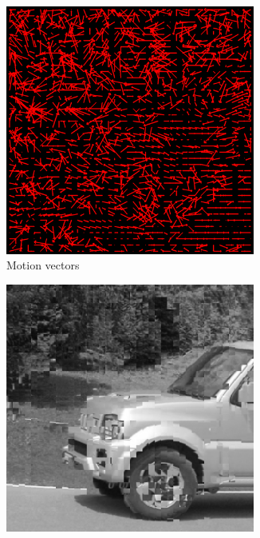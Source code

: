 \documentclass{homework}
\begin{document}
\begin{figure}[H]
    \centering
    \begin{subfigure}{0.32\textwidth}
        \centering
        \includegraphics[width=0.9\textwidth]{8_8_TSS_motion_vectors.png}
        \caption{Motion vectors}
    \end{subfigure}
    \begin{subfigure}{0.32\textwidth}
        \centering
        \includegraphics[width=0.9\textwidth]{8_8_TSS_motion_compensation.png}

\end{subfigure}
\end{figure}
\end{document}
